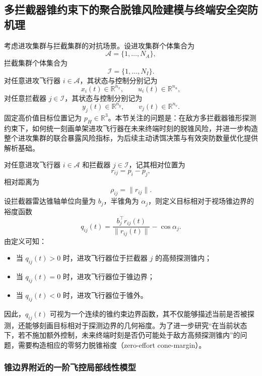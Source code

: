 \subsection{多拦截器锥约束下的聚合脱锥风险建模与终端安全突防机理}

考虑进攻集群与拦截集群的对抗场景。设进攻集群个体集合为
\[
\mathcal{A}=\{1,\dots,N_A\},
\]
拦截集群个体集合为
\[
\mathcal{I}=\{1,\dots,N_I\}.
\]
对任意进攻飞行器 $i\in\mathcal{A}$，其状态与控制分别记为
\[
x_i(t)\in\mathbb{R}^{n_x},\qquad u_i(t)\in\mathbb{R}^{n_u},
\]
对任意拦截器 $j\in\mathcal{I}$，其状态与控制分别记为
\[
y_j(t)\in\mathbb{R}^{n_y},\qquad v_j(t)\in\mathbb{R}^{n_v}.
\]
固定高价值目标位置记为 $p_H\in\mathbb{R}^3$。本节关注的问题是：在敌方多拦截器锥形探测约束下，如何统一刻画单架进攻飞行器在未来终端时刻的脱锥风险，并进一步构造整个进攻集群的联合暴露风险指标，为后续主动诱饵决策与有效突防数量优化提供解析基础。

对任意进攻飞行器 $i\in\mathcal{A}$ 和拦截器 $j\in\mathcal{I}$，记其相对位置为
\begin{equation}
r_{ij}=p_i-p_j,
\end{equation}
相对距离为
\begin{equation}
\rho_{ij}=\|r_{ij}\|.
\end{equation}
设拦截器雷达锥轴单位向量为 $b_j$，半锥角为 $\alpha_j$，则定义目标相对于视场锥边界的裕度函数
\begin{equation}
q_{ij}(t)
=
\frac{b_j^{\top}r_{ij}(t)}{\|r_{ij}(t)\|}-\cos\alpha_j.
\end{equation}
由定义可知：

\begin{itemize}
  \item 当 $q_{ij}(t)>0$ 时，进攻飞行器位于拦截器 $j$ 的高频探测锥内；
  \item 当 $q_{ij}(t)=0$ 时，进攻飞行器位于锥边界；
  \item 当 $q_{ij}(t)<0$ 时，进攻飞行器位于锥外。
\end{itemize}

因此，$q_{ij}(t)$ 可视为一个连续的锥约束边界函数，其不仅能够描述当前是否被探测，还能够刻画目标相对于探测边界的几何裕度。为了进一步研究“在当前状态下，若不施加额外控制，未来终端时刻是否仍可能处于敌方高频探测锥内”的问题，需要构造相应的零努力脱锥裕度（zero-effort cone-margin）。

\subsubsection{锥边界附近的一阶飞控局部线性模型}

